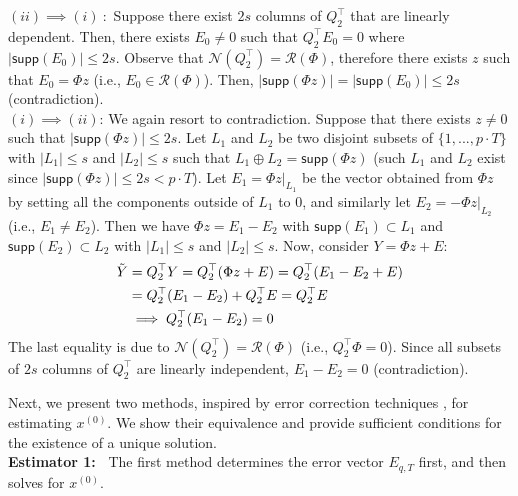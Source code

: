 \documentclass[twocolumn]{autart}    %
\newcommand{\rev}[1]{{\normalsize{{{\color{blue}#1}}}}}
\begin{document}
\begin{pf}
$(ii) \implies (i)~:$ Suppose there exist $2s$ columns of $Q_2^\top$ that are linearly dependent. Then, there exists $E_0 \neq 0$ such that $Q_2^\top E_0 = 0$ where $\lvert \textsf{supp}(E_0) \rvert \le 2s$. Observe that $\mathcal{N}(Q_2^\top) = \mathcal{R}(\Phi)$, therefore there exists $z$ such that $E_0 = \Phi z$ (i.e., $E_0 \in \mathcal{R}(\Phi)$). Then, $ \lvert  \textsf{supp}(\Phi z) \rvert = \lvert \textsf {supp} (E_0) \rvert \le 2s $ (contradiction).\\
$(i) \implies (ii)$: We again resort to contradiction. Suppose that there exists $z\neq 0$ such that $\lvert \textsf{supp}(\Phi z)\rvert \le 2s$. Let $L_1$ and $L_2$ be two disjoint subsets of $\{1,..., p\cdot T \}$ with $\lvert L_1 \rvert \le s$ and $\lvert L_2 \rvert \le s$ such that $L_1 \oplus L_2 = \textsf{supp}(\Phi z)$ (such $L_1$ and $L_2$ exist since $\lvert \textsf{supp}(\Phi z) \rvert \le 2s < p\cdot T$). Let $E_1 = \Phi z \lvert _{L_1}$ be the vector obtained from $\Phi z$ by setting all the components outside of $L_1$ to 0, and similarly let $E_2= - \Phi z \lvert _{L_2}$ (i.e., $E_1 \neq E_2$). Then we have $\Phi z = E_1 - E_2$ with $\textsf{supp}(E_1) \subset L_1$ and $\textsf{supp}(E_2) \subset L_2$ with $\lvert L_1 \rvert \le s$ and $\lvert L_2 \rvert \le s$. Now, consider $Y=\Phi z + E$:
\vspace{-0.2cm}
\begin{equation}
\begin{aligned}
	\tilde Y &= Q_2^\top Y =  Q_2^\top (\Phi z+E) =  Q_2^\top (E_1 - E_2 + E  ) \\
	& =  Q_2^\top(E_1-E_2) +  Q_2^\top E =  Q_2^\top E \\
	& \implies  Q_2^\top (E_1-E_2) = 0 \nonumber 
\end{aligned}
\vspace{-0.2cm}
\end{equation}
The last equality is due to $\mathcal{N}(Q_2^\top) = \mathcal{R}(\Phi)$ (i.e., $Q_2^\top \Phi = 0$). Since all subsets of $2s$ columns of $Q_2^\top$ are linearly independent, $E_1 - E_2 = 0 $ (contradiction).
\end{pf}
\vspace{-0.6cm}
Next, we present two methods, inspired by error correction techniques \cite{Candes_Tao}\cite{David_Chang}, for estimating $x^{(0)}$. We show their equivalence and provide sufficient conditions for the existence of a unique solution.\\
{\bf \rev{Estimator} 1:~} The first method determines the error vector $E_{q,T}$ first, and then solves for $x^{(0)}$. 
\end{document}
